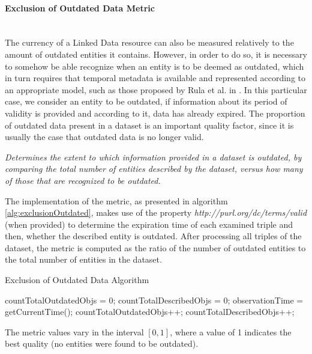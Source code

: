
\paragraph{Exclusion of Outdated Data Metric}~\\ %
The currency of a Linked Data resource can also be measured relatively to the amount of outdated entities it contains. However, in order to do so, it is necessary to somehow be able recognize when an entity is to be deemed as outdated, which in turn requires that temporal metadata is available and represented according to an appropriate model, such as those proposed by Rula et al. in \cite{Rula2012A}. In this particular case, we consider an entity to be outdated, if information about its period of validity is provided and according to it, data has already expired. The proportion of outdated data present in a dataset is an important quality factor, since it is usually the case that outdated data is no longer valid.
\begin{mdframed}[style=metricdefinition]
\emph{Determines the extent to which information provided in a dataset is outdated, by comparing the total number of entities described by the dataset, versus how many of those that are recognized to be outdated.}
\end{mdframed}

The implementation of the metric, as presented in algorithm \ref{alg:exclusionOutdated}, makes use of the property \textit{http://purl.org/dc/terms/valid} (when provided) to determine the expiration time of each examined triple and then, whether the described entity is outdated. After processing all triples of the dataset, the metric is computed as the ratio of the number of outdated entities to the total number of entities in the dataset.
\begin{algorithm}
\caption{Exclusion of Outdated Data Algorithm} \label{alg:exclusionOutdated}
\begin{algorithmic}[1]
\State countTotalOutdatedObjs = 0;
\State countTotalDescribedObjs = 0;
\State observationTime = getCurrentTime();
\EndProcedure
{}
\State countTotalOutdatedObjs++;
\EndIf
\EndIf
{} 
\State countTotalDescribedObjs++;
\EndIf ~\\
\EndProcedure
\end{algorithmic}
\end{algorithm}
The metric values vary in the interval $[0, 1]$, where a value of 1 indicates the best quality (no entities were found to be outdated).

